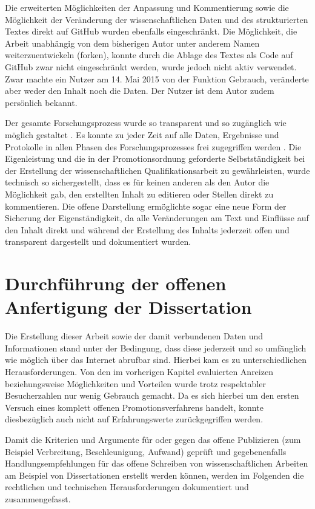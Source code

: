 Die erweiterten Möglichkeiten der Anpassung und Kommentierung sowie die Möglichkeit der Veränderung der wissenschaftlichen Daten und des strukturierten Textes direkt auf GitHub wurden ebenfalls eingeschränkt. Die Möglichkeit, die Arbeit unabhängig von dem bisherigen Autor unter anderem Namen weiterzuentwickeln (forken), konnte durch die Ablage des Textes als Code auf GitHub zwar nicht eingeschränkt werden, wurde jedoch nicht aktiv verwendet. Zwar machte ein Nutzer am 14. Mai 2015 von der Funktion Gebrauch, veränderte aber weder den Inhalt noch die Daten. Der Nutzer ist dem Autor zudem persönlich bekannt.

Der gesamte Forschungsprozess wurde so transparent und so zugänglich wie möglich gestaltet \cite{Scheliga_2014}. Es konnte zu jeder Zeit auf alle Daten, Ergebnisse und Protokolle in allen Phasen des Forschungsprozesses frei zugegriffen werden \cite{RIN_2010_open_research}. Die Eigenleistung und die in der Promotionsordnung geforderte \cite{Leuphana_2011} Selbstständigkeit bei der Erstellung der wissenschaftlichen Qualifikationsarbeit zu gewährleisten, wurde technisch so sichergestellt, dass es für keinen anderen als den Autor die Möglichkeit gab, den erstellten Inhalt zu editieren oder Stellen direkt zu kommentieren. Die offene Darstellung ermöglichte sogar eine neue Form der Sicherung der Eigenständigkeit, da alle Veränderungen am Text und Einflüsse auf den Inhalt direkt und während der Erstellung des Inhalts jederzeit offen und transparent dargestellt und dokumentiert wurden.

\section{Durchführung der offenen Anfertigung der Dissertation}

Die Erstellung dieser Arbeit sowie der damit verbundenen Daten und Informationen stand unter der Bedingung, dass diese jederzeit und so umfänglich wie möglich über das Internet abrufbar sind. Hierbei kam es zu unterschiedlichen Herausforderungen. Von den im vorherigen Kapitel evaluierten Anreizen beziehungsweise Möglichkeiten und Vorteilen wurde trotz respektabler Besucherzahlen nur wenig Gebrauch gemacht. Da es sich hierbei um den ersten Versuch eines komplett offenen Promotionsverfahrens handelt, konnte diesbezüglich auch nicht auf Erfahrungswerte zurückgegriffen werden.

Damit die Kriterien und Argumente für oder gegen das offene Publizieren (zum Beispiel Verbreitung, Beschleunigung, Aufwand) geprüft und gegebenenfalls Handlungsempfehlungen für das offene Schreiben von wissenschaftlichen Arbeiten am Beispiel von Dissertationen erstellt werden können, werden im Folgenden die rechtlichen und technischen Herausforderungen dokumentiert und zusammengefasst.

